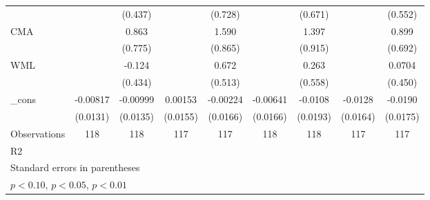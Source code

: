 \begin{table}[htbp]
\begin{tabular}{l*{8}{c}}
                    &                     &     (0.437)         &                     &     (0.728)         &                     &     (0.671)         &                     &     (0.552)         \\
CMA                 &                     &       0.863         &                     &       1.590\sym{*}  &                     &       1.397         &                     &       0.899         \\
                    &                     &     (0.775)         &                     &     (0.865)         &                     &     (0.915)         &                     &     (0.692)         \\
WML                 &                     &      -0.124         &                     &       0.672         &                     &       0.263         &                     &      0.0704         \\
                    &                     &     (0.434)         &                     &     (0.513)         &                     &     (0.558)         &                     &     (0.450)         \\
\_cons              &    -0.00817         &    -0.00999         &     0.00153         &    -0.00224         &    -0.00641         &     -0.0108         &     -0.0128         &     -0.0190         \\
                    &    (0.0131)         &    (0.0135)         &    (0.0155)         &    (0.0166)         &    (0.0166)         &    (0.0193)         &    (0.0164)         &    (0.0175)         \\
\hline
Observations        &         118         &         118         &         117         &         117         &         118         &         118         &         117         &         117         \\
R2                  &                     &                     &                     &                     &                     &                     &                     &                     \\
\hline\hline
\multicolumn{9}{l}{\footnotesize Standard errors in parentheses}\\
\multicolumn{9}{l}{\footnotesize \sym{*} \(p<0.10\), \sym{**} \(p<0.05\), \sym{***} \(p<0.01\)}\\
\end{tabular}
\end{table}
